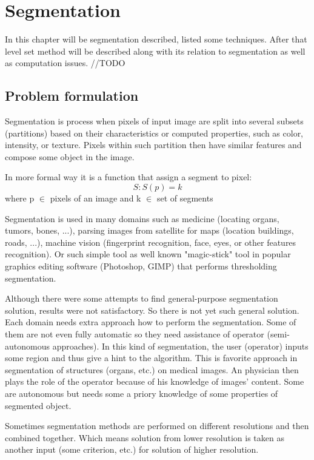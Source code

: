 \chapter{Segmentation}

In this chapter will be segmentation described, listed some techniques.
After that level set method will be described along with its relation to segmentation as well as computation issues. //TODO

\section{Problem formulation}
Segmentation is process when pixels of input image are split into several subsets (partitions) based on their characteristics or computed properties, such as color, intensity, or texture.
Pixels within such partition then have similar features and compose some object in the image.

In more formal way it is a function that assign a segment to pixel:
\begin{equation}
S: S(p) = k
\end{equation}
where p $\in$ pixels of an image and k $\in$ set of segments

Segmentation is used in many domains such as medicine (locating organs, tumors, bones, ...), parsing images from satellite for maps (location buildings, roads, ...), machine vision (fingerprint recognition, face, eyes, or other features recognition).
Or such simple tool as well known "magic-stick" tool in popular graphics editing software (Photoshop, GIMP) that performs thresholding segmentation.

Although there were some attempts to find general-purpose segmentation solution, results were not satisfactory.
So there is not yet such general solution. Each domain needs extra approach how to perform the segmentation.
Some of them are not even fully automatic so they need assistance of operator (semi-autonomous approaches).
In this kind of segmentation, the user (operator) inputs some region and thus give a hint to the algorithm.
This is favorite approach in segmentation of structures (organs, etc.) on medical images.
An physician then plays the role of the operator because of his knowledge of images' content.
Some are autonomous but needs some a priory knowledge of some properties of segmented object.

Sometimes segmentation methods are performed on different resolutions and then combined together.
Which means solution from lower resolution is taken as another input (some criterion, etc.) for solution of higher resolution.

